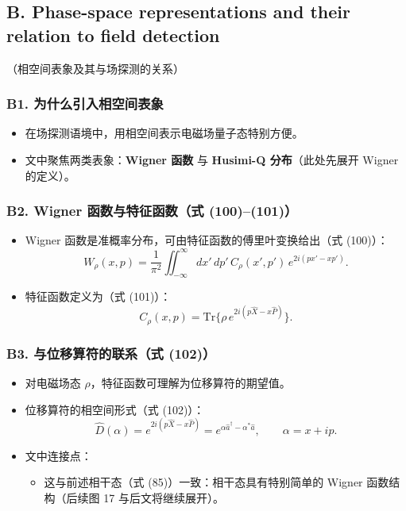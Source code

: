 \documentclass[12pt,a4paper,oneside]{ctexbook}
\providecommand{\tightlist}{%
  \setlength{\itemsep}{0pt}\setlength{\parskip}{0pt}}
\begin{document}
\subsection{B. Phase-space representations and their relation to
field
detection}\label{b.-phase-space-representations-and-their-relation-to-field-detection}

（相空间表象及其与场探测的关系）

\subsubsection{B1.
为什么引入相空间表象}\label{b1.-ux4e3aux4ec0ux4e48ux5f15ux5165ux76f8ux7a7aux95f4ux8868ux8c61}

\begin{itemize}
\tightlist
\item
  在场探测语境中，用相空间表示电磁场量子态特别方便。
\item
  文中聚焦两类表象：\textbf{Wigner 函数} 与 \textbf{Husimi-Q
  分布}（此处先展开 Wigner 的定义）。
\end{itemize}

\subsubsection{B2. Wigner 函数与特征函数（式
(100)--(101)）}\label{b2.-wigner-ux51fdux6570ux4e0eux7279ux5f81ux51fdux6570ux5f0f-100101}

\begin{itemize}
\tightlist
\item
  Wigner 函数是准概率分布，可由特征函数的傅里叶变换给出（式 (100)）： \[
  W_\rho(x,p)=\frac{1}{\pi^2}\iint_{-\infty}^{\infty}dx'\,dp'\,
  C_\rho(x',p')\,e^{2i(px'-x p')}.
  \]
\item
  特征函数定义为（式 (101)）： \[
  C_\rho(x,p)=\mathrm{Tr}\Big\{\rho\,e^{2i(p\hat{X}-x\hat{P})}\Big\}.
  \]
\end{itemize}

\subsubsection{B3. 与位移算符的联系（式
(102)）}\label{b3.-ux4e0eux4f4dux79fbux7b97ux7b26ux7684ux8054ux7cfbux5f0f-102}

\begin{itemize}
\tightlist
\item
  对电磁场态 \(\rho\)，特征函数可理解为位移算符的期望值。
\item
  位移算符的相空间形式（式 (102)）： \[
  \hat{D}(\alpha)=e^{2i(p\hat{X}-x\hat{P})}=e^{\alpha\hat{a}^\dagger-\alpha^*\hat{a}},
  \qquad \alpha=x+ip.
  \]
\item
  文中连接点：

  \begin{itemize}
  \tightlist
  \item
    这与前述相干态（式 (85)）一致：相干态具有特别简单的 Wigner
    函数结构（后续图 17 与后文将继续展开）。
  \end{itemize}
\end{itemize}
\end{document}
